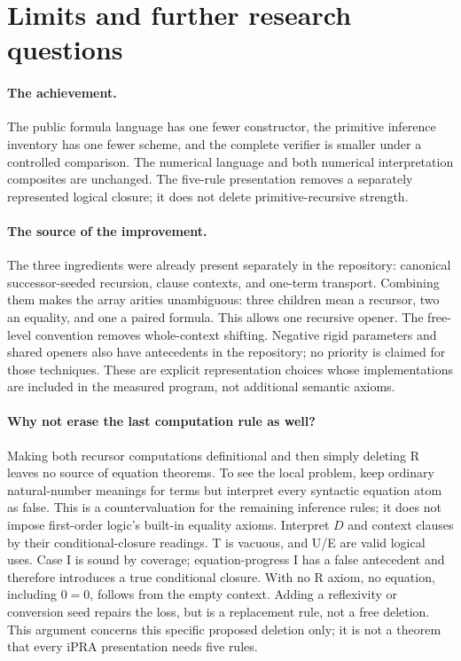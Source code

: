 \section{Limits and further research questions}

\paragraph{The achievement.}
The public formula language has one fewer constructor, the primitive inference inventory has one fewer scheme, and the complete verifier is smaller under a controlled comparison. The numerical language and both numerical interpretation composites are unchanged. The five-rule presentation removes a separately represented logical closure; it does not delete primitive-recursive strength.

\paragraph{The source of the improvement.}
The three ingredients were already present separately in the repository: canonical successor-seeded recursion, clause contexts, and one-term transport. Combining them makes the array arities unambiguous: three children mean a recursor, two an equality, and one a paired formula. This allows one recursive opener. The free-level convention removes whole-context shifting. Negative rigid parameters and shared openers also have antecedents in the repository; no priority is claimed for those techniques. These are explicit representation choices whose implementations are included in the measured program, not additional semantic axioms.

\paragraph{Why not erase the last computation rule as well?}
Making both recursor computations definitional and then simply deleting R leaves no source of equation theorems. To see the local problem, keep ordinary natural-number meanings for terms but interpret every syntactic equation atom as false. This is a countervaluation for the remaining inference rules; it does not impose first-order logic's built-in equality axioms. Interpret $D$ and context clauses by their conditional-closure readings. T is vacuous, and U/E are valid logical uses. Case I is sound by coverage; equation-progress I has a false antecedent and therefore introduces a true conditional closure. With no R axiom, no equation, including $0=0$, follows from the empty context. Adding a reflexivity or conversion seed repairs the loss, but is a replacement rule, not a free deletion. This argument concerns this specific proposed deletion only; it is not a theorem that every iPRA presentation needs five rules.

